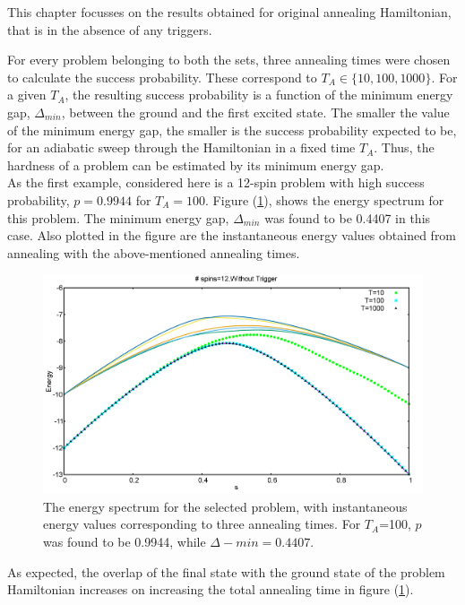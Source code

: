 \documentclass[../main.tex]{subfiles}
\begin{document}
This chapter focusses on the results obtained for original annealing Hamiltonian, that is in the absence of any triggers. 


For every problem belonging to both the sets, three annealing times were chosen to calculate the success probability. These correspond to $T_A \in \{ 10,100,1000 \}$. For a given $T_A$, the resulting success probability is a function of the minimum energy gap, $\Delta_{min}$, between the ground and the first excited state. The smaller the value of the minimum energy gap, the smaller is the success probability expected to be, for an adiabatic sweep through the Hamiltonian in a fixed time $T_A$. Thus, the hardness of a problem can be estimated by its minimum energy gap.\\


As the first example, considered here is a 12-spin problem with high success probability, $p=0.9944$ for $T_A=100$. Figure (\ref{fig:o2}), shows the energy spectrum for this problem. The minimum energy gap, $\Delta_{min}$ was found to be 0.4407 in this case.  Also plotted in the figure are the instantaneous energy values obtained from annealing with the above-mentioned annealing times.
\begin{figure}[H]
\centering 
\includegraphics[scale=0.3]{733_s12_O.png}
\caption{The energy spectrum for the selected problem, with instantaneous energy values corresponding to three annealing times. For $T_A$=100, $p$ was found to be 0.9944, while $\Delta-{min}=0.4407.$}
\label{fig:o2}
\end{figure}

As expected, the overlap of the final state with the ground state of the problem Hamiltonian increases on increasing the total annealing time in figure (\ref{fig:o2}).\\
\end{document}
